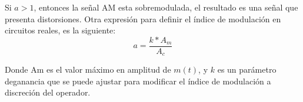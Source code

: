\documentclass{article}
\begin{document}
Si $a > 1$, entonces la señal AM esta sobremodulada, el resultado es una señal que presenta distorsiones. Otra expresión para definir el índice de modulación en circuitos reales, es la siguiente:\citep{IndiceModulacion}\\

\begin{equation}
    a=\frac{k*A_m}{A_c}
\end{equation}

Donde Am es el valor máximo en amplitud de $m(t)$, y $k$ es un parámetro deganancia que se puede ajustar para modificar el índice de modulación a discreción del operador.\citep{IndiceModulacion}\\

 







\end{document}
